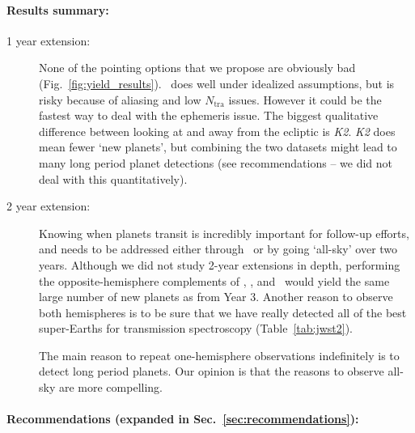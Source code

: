 \paragraph{Results summary:}
\begin{description}
	\item[1 year extension:]
	None of the pointing options that we propose are obviously bad (Fig.~\ref{fig:yield_results}).
	\hemis\ does well under idealized assumptions, but is risky because of aliasing and low $N_\mathrm{tra}$ issues. 
	However it could be the fastest way to deal with the ephemeris issue.
	The biggest qualitative difference between looking at and away from the ecliptic is \textit{K2}.
	\textit{K2} does mean fewer `new \tess planets', but combining the two datasets might lead to many long period planet detections (see recommendations -- we did not deal with this quantitatively).
	
	\item[2 year extension:]
	Knowing when \tess planets transit is incredibly important for follow-up efforts, and needs to be addressed either through \hemis\ or by going `all-sky' over two years.
	Although we did not study 2-year extensions in depth, performing the opposite-hemisphere complements of \nhemi, \npole, and \shemiAvoid\ would yield the same large number of new planets as from Year 3.
	Another reason to observe both hemispheres is to be sure that we have really detected all of the best super-Earths for transmission spectroscopy (Table~\ref{tab:jwst2}).
	
	The main reason to repeat one-hemisphere observations indefinitely is to detect long period planets.
	Our opinion is that the reasons to observe all-sky are more compelling.
	
\end{description}



\paragraph{Recommendations (expanded in Sec.~\ref{sec:recommendations}):}

